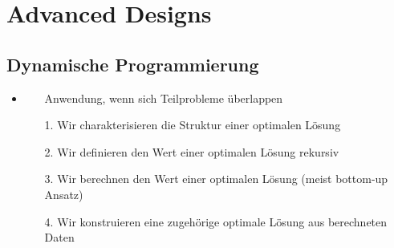 \documentclass[
    12pt,
    a4paper,
    ngerman,
    color=3b,%
    marginpar=false,
    colorback=false,
    leqno,
]{tudaexercise}
\begin{document}
\section{Advanced Designs}
\subsection{Dynamische Programmierung}
    \begin{itemize}
        \item {}
            \begin{itemize}
                \item[] Anwendung, wenn sich Teilprobleme überlappen
                \item[1.] Wir charakterisieren die Struktur einer optimalen Lösung
                \item[2.] Wir definieren den Wert einer optimalen Lösung rekursiv
                \item[3.] Wir berechnen den Wert einer optimalen Lösung (meist bottom-up Ansatz)
                \item[4.] Wir konstruieren eine zugehörige optimale Lösung aus berechneten Daten   
            \end{itemize}


\end{itemize}
\end{document}

